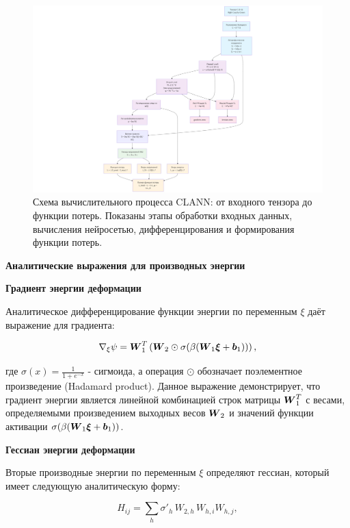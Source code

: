 \begin{figure}[htbp]
\centering
\includegraphics[width=1.3\textwidth]{img/clann_arc.png}
\caption{Схема вычислительного процесса CLANN: от входного тензора до функции потерь. Показаны этапы обработки входных данных, вычисления нейросетью, дифференцирования и формирования функции потерь.}
\label{fig:clann_architecture}
\end{figure}

\textbf{Аналитические выражения для производных энергии}

\textbf{Градиент энергии деформации}

Аналитическое дифференцирование функции энергии по переменным \(\xi\) даёт выражение для градиента:

\begin{equation}
 \nabla_\xi \psi = \boldsymbol{W}_1^T \left( \boldsymbol{W}_2 \odot \sigma(\beta (\boldsymbol{W}_1 \boldsymbol{\xi} + \boldsymbol{b}_1)) \right),
\label{eq:energy_gradient}
\end{equation}

где $\sigma(x) = \frac{1}{1 + e^{-x}}$ - сигмоида, 
а операция $\odot$ обозначает поэлементное произведение (Hadamard product). 
Данное выражение демонстрирует, что градиент энергии является линейной комбинацией строк матрицы $\boldsymbol{W}_1^T$ с весами, 
определяемыми произведением выходных весов $\boldsymbol{W}_2$ и значений функции активации $\sigma(\beta (\boldsymbol{W}_1 \boldsymbol{\xi} + \boldsymbol{b}_1))$.

\textbf{Гессиан энергии деформации}

Вторые производные энергии по переменным \(\xi\) определяют гессиан, который имеет следующую аналитическую форму:

\begin{equation}
 H_{ij} = \sum_h \sigma'_h\,W_{2,h}\,W_{h,i}W_{h,j},
\label{eq:energy_hessian}
\end{equation}

